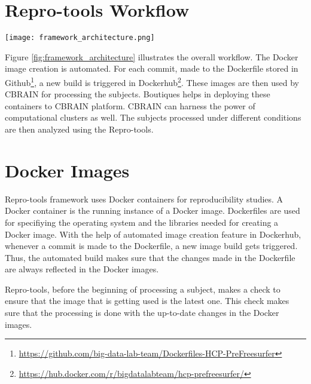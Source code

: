 \section{Repro-tools Workflow}\label{workflow}
\begin{center}
\texttt{[image: framework\_architecture.png]}
\label{fig:framework_architecture}
\end{center}
\vskip 0.2in

Figure \ref{fig:framework_architecture} illustrates the overall workflow. The Docker image creation is automated. For each commit, made to the Dockerfile stored in Github\footnote{\url{https://github.com/big-data-lab-team/Dockerfiles-HCP-PreFreesurfer}}, a new build is triggered in Dockerhub\footnote{\url{https://hub.docker.com/r/bigdatalabteam/hcp-prefreesurfer/}}. These images are then used by CBRAIN for processing the subjects. Boutiques helps in deploying these containers to CBRAIN platform. CBRAIN can harness the power of computational clusters as well. The subjects processed under different conditions are then analyzed using the Repro-tools.

\section{Docker Images}\label{docker_images}
Repro-tools framework uses Docker containers for reproducibility 
studies. A Docker container is the running instance of a Docker image. 
Dockerfiles are used for specifiying the operating system and the 
libraries needed for creating a Docker image. With the help of 
automated image creation feature in Dockerhub, whenever a commit is 
made to the Dockerfile, a new image build gets triggered.
Thus, the automated build makes sure that the changes made in the Dockerfile are always reflected in the Docker images.

Repro-tools, before the beginning of processing a subject, makes a check to ensure that the image that is getting used is the latest one. This check makes sure that the processing is done with the up-to-date changes in the Docker images.


